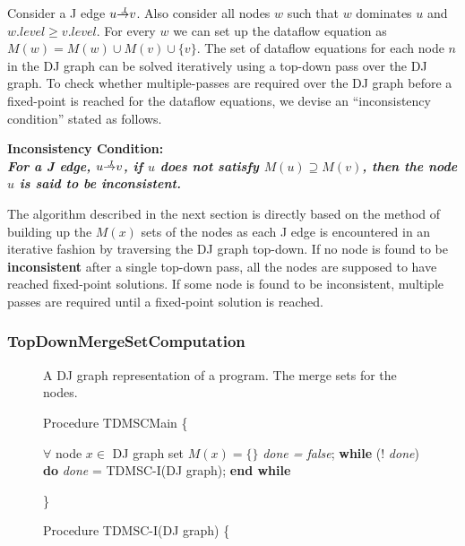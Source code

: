 {Consider a J edge $u \st{J} v$. Also consider all nodes $w$ such that $w$ dominates $u$ and $w.level \geq v.level$. For every $w$ we can set up the dataflow equation as $M(w) = M(w) \cup M(v) \cup \{v\}$. The set of dataflow equations for each node $n$ in the DJ graph can be solved iteratively using a top-down pass over the DJ graph. To check whether multiple-passes are required over the DJ graph before a fixed-point is reached for the dataflow equations, we devise an ``inconsistency condition'' stated as follows.

\begin{center}
\bf{Inconsistency Condition:}\\
\it{For a J edge, $u \st{J} v$, if $u$ does not satisfy
$M(u)\supseteq M(v)$, then the node $u$ is said to be inconsistent}. 
\end{center}

The algorithm described in the next section is directly based on the method of building
up the $M(x)$ sets of the nodes as each J edge is encountered in an iterative fashion by
traversing the DJ graph top-down. If no node is found to be {\bf inconsistent} after a single 
top-down pass, all the nodes are supposed to have reached fixed-point solutions. If some node
is found to be inconsistent, multiple passes are required until a fixed-point solution is reached.


\subsubsection{TopDownMergeSetComputation}

\begin{figure}[!ht]
\centering
\begin{minipage}[t]{5in}
 A DJ graph representation of a program.
 The merge sets for the nodes.

\setcounter{linectr}{0}
Procedure TDMSCMain
\{
\begin{code}
 $\forall$ node $x \in$ DJ graph set $M(x) = \{\}$
 {\it done = false};
 {\bf while} (! {\it done}) {\bf do}
     {\it done} = TDMSC-I(DJ graph);
 {\bf end while}
\end{code}
\}

Procedure TDMSC-I(DJ graph)
\{
\begin{code}


\end{code}
\end{minipage}
\end{figure}}
